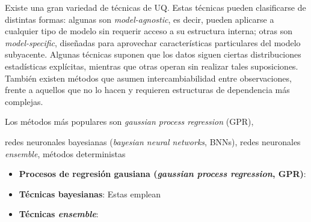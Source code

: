 Existe una gran variedad de técnicas de UQ. Estas técnicas pueden clasificarse de distintas formas: algunas 
son \textit{model-agnostic}, es decir, pueden aplicarse a cualquier tipo de modelo sin 
requerir acceso a su estructura interna; otras son \textit{model-specific}, diseñadas para aprovechar 
características particulares del modelo subyacente. 
Algunas técnicas suponen que los datos siguen ciertas 
distribuciones estadísticas explícitas, mientras que otras operan sin realizar tales suposiciones. 
También existen métodos que asumen intercambiabilidad entre observaciones, frente a aquellos que no lo hacen 
y requieren estructuras de dependencia más complejas. 

Los métodos más populares son \textit{gaussian process regression} (GPR),

redes neuronales bayesianas (\textit{bayesian neural networks}, BNNs),
redes neuronales \textit{ensemble}, 
métodos deterministas

\begin{itemize}
    \item \textbf{Procesos de regresión gausiana (\textit{gaussian process regression}, GPR)}: 
    
    \item \textbf{Técnicas bayesianas}: Estas emplean

    \item \textbf{Técnicas \textit{ensemble}}:  
\end{itemize}











    

